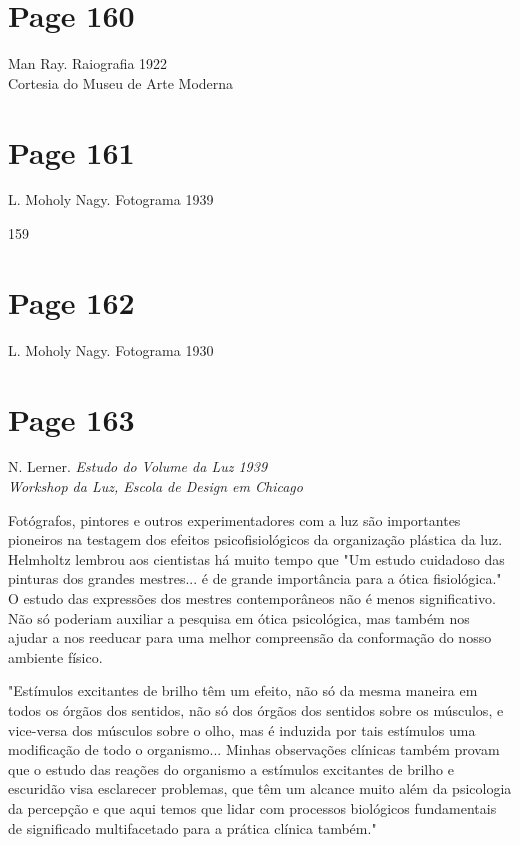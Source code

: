 \documentclass[a4paper]{article}
\begin{document}
\section*{Page 160}

\small
Man Ray. Raiografia 1922\\
Cortesia do Museu de Arte Moderna
\par

\vfill
{}

\newpage
\section*{Page 161}

L. Moholy Nagy. Fotograma 1939

\vspace*{\fill}
159

\newpage
\section*{Page 162}

L. Moholy Nagy. Fotograma 1930

\newpage
\section*{Page 163}

N. Lerner. \textit{Estudo do Volume da Luz 1939} \\
\textit{Workshop da Luz, Escola de Design em Chicago}

Fotógrafos, pintores e outros experimentadores com a luz são importantes pioneiros na testagem dos efeitos psicofisiológicos da organização plástica da luz. Helmholtz lembrou aos cientistas há muito tempo que "Um estudo cuidadoso das pinturas dos grandes mestres... é de grande importância para a ótica fisiológica." O estudo das expressões dos mestres contemporâneos não é menos significativo. Não só poderiam auxiliar a pesquisa em ótica psicológica, mas também nos ajudar a nos reeducar para uma melhor compreensão da conformação do nosso ambiente físico.

"Estímulos excitantes de brilho têm um efeito, não só da mesma maneira em todos os órgãos dos sentidos, não só dos órgãos dos sentidos sobre os músculos, e vice-versa dos músculos sobre o olho, mas é induzida por tais estímulos uma modificação de todo o organismo... Minhas observações clínicas também provam que o estudo das reações do organismo a estímulos excitantes de brilho e escuridão visa esclarecer problemas, que têm um alcance muito além da psicologia da percepção e que aqui temos que lidar com processos biológicos fundamentais de significado multifacetado para a prática clínica também."\textbullet
\end{document}
